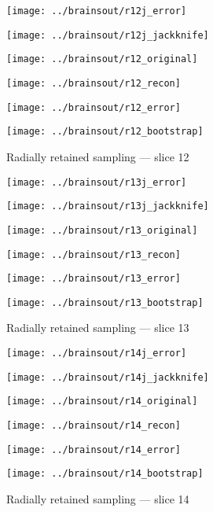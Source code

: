 \documentclass[review,supplement,onefignum,onetabnum,juq]{siamonline181217}
\begin{document}
\begin{figure}
\begin{centering}

\parbox{\imsize}{\texttt{[image: ../brainsout/r12j\_error]}}
\parbox{\imsize}{\texttt{[image: ../brainsout/r12j\_jackknife]}}

\vspace{\vertsep}

\parbox{\imsize}{\texttt{[image: ../brainsout/r12\_original]}}
\parbox{\imsize}{\texttt{[image: ../brainsout/r12\_recon]}}

\vspace{\vertsep}

\parbox{\imsize}{\texttt{[image: ../brainsout/r12\_error]}}
\parbox{\imsize}{\texttt{[image: ../brainsout/r12\_bootstrap]}}

\end{centering}
\caption{Radially retained sampling --- slice 12}
\end{figure}


\begin{figure}
\begin{centering}

\parbox{\imsize}{\texttt{[image: ../brainsout/r13j\_error]}}
\parbox{\imsize}{\texttt{[image: ../brainsout/r13j\_jackknife]}}

\vspace{\vertsep}

\parbox{\imsize}{\texttt{[image: ../brainsout/r13\_original]}}
\parbox{\imsize}{\texttt{[image: ../brainsout/r13\_recon]}}

\vspace{\vertsep}

\parbox{\imsize}{\texttt{[image: ../brainsout/r13\_error]}}
\parbox{\imsize}{\texttt{[image: ../brainsout/r13\_bootstrap]}}

\end{centering}
\caption{Radially retained sampling --- slice 13}
\end{figure}


\begin{figure}
\begin{centering}

\parbox{\imsize}{\texttt{[image: ../brainsout/r14j\_error]}}
\parbox{\imsize}{\texttt{[image: ../brainsout/r14j\_jackknife]}}

\vspace{\vertsep}

\parbox{\imsize}{\texttt{[image: ../brainsout/r14\_original]}}
\parbox{\imsize}{\texttt{[image: ../brainsout/r14\_recon]}}

\vspace{\vertsep}

\parbox{\imsize}{\texttt{[image: ../brainsout/r14\_error]}}
\parbox{\imsize}{\texttt{[image: ../brainsout/r14\_bootstrap]}}

\end{centering}
\caption{Radially retained sampling --- slice 14}
\end{figure}
\end{document}
